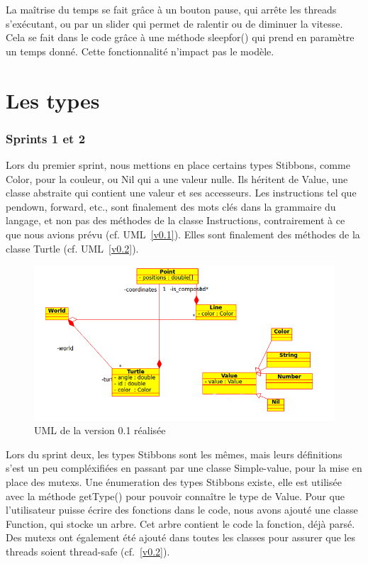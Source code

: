La maîtrise du temps se fait grâce à un bouton pause, qui arrête les threads s'exécutant, ou par un slider qui permet de ralentir ou de diminuer la vitesse. Cela se fait dans le code grâce à une méthode sleepfor() qui prend en paramètre un temps donné. Cette fonctionnalité n'impact pas le modèle.

\section{Les types}
\subsubsection{Sprints 1 et 2}
Lors du premier sprint, nous mettions en place certains types Stibbons, comme Color, pour la couleur, ou Nil qui a une valeur nulle. Ils héritent de Value, une classe abstraite qui contient une valeur et ses accesseurs.
Les instructions tel que pendown, forward, etc., sont finalement des mots clés dans la grammaire du langage, et non pas des méthodes de la classe Instructions, contrairement à ce que nous avions prévu (cf. UML~\ref{v0.1}).
Elles sont finalement des méthodes de la classe Turtle (cf. UML~\ref{v0.2}).

\begin{figure}[h]
\includegraphics[scale=0.5]{doc/report/uml/v01reel.png}
\caption{\label{v0.1R} UML de la version 0.1 réalisée}
\end{figure}

Lors du sprint deux, les types Stibbons sont les mêmes, mais leurs définitions s'est un peu compléxifiées en passant par une classe Simple-value, pour la mise en place des mutexs. Une énumeration des types Stibbons existe, elle est utilisée avec la méthode getType() pour pouvoir connaître le type de Value.
Pour que l'utilisateur puisse écrire des fonctions dans le code, nous avons ajouté une classe Function, qui stocke un arbre. Cet arbre contient le code la fonction, déjà parsé.
Des mutexs ont également été ajouté dans toutes les classes pour assurer que les threads soient thread-safe (cf.~\ref{v0.2}).

